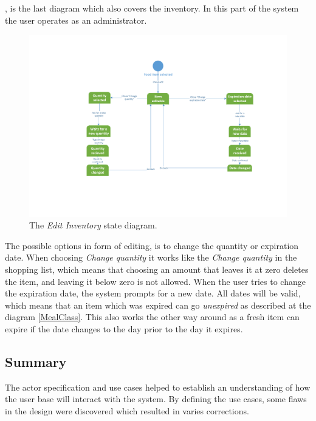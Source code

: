 , is the last diagram which also covers the inventory. In this part of the system the user operates as an administrator.

\begin{figure}[H]
	\centering
	\includegraphics[width=1.0\textwidth, trim= 0 5cm 0 4cm]{ApplicationDomain/spEditInventory.pdf} 
	\caption{The \textit{Edit Inventory} state diagram.}
	\label{spEditInventory}
\end{figure}
The possible options in form of editing, is to change the quantity or expiration date. 
When choosing \textit{Change quantity} it works like the \textit{Change quantity} in the shopping list, which means that choosing an amount that leaves it at zero deletes the item, and leaving it below zero is not allowed. When the user tries to change the expiration date, the system prompts for a new date. All dates will be valid, which means that an item which was expired can go \textit{unexpired} as described at the diagram \cref{MealClass}. This also works the other way around as a fresh item can expire if the date changes to the day prior to the day it expires.

\subsection*{Summary}
The actor specification and use cases helped to establish an understanding of how the user base will interact with the system. By defining the use cases, some flaws in the design were discovered which resulted in varies corrections.